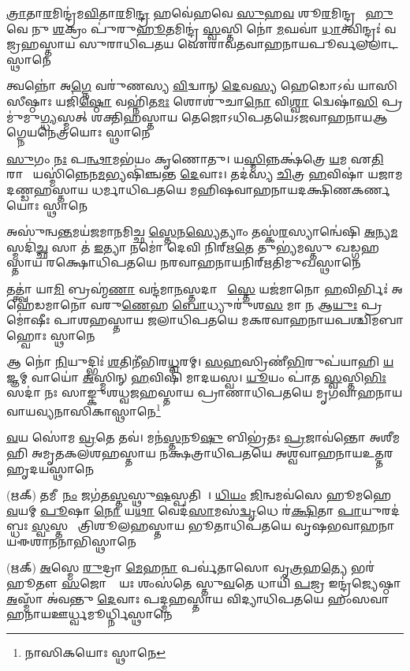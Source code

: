 %
{\ul{𑌤𑍍𑌰𑌾}𑌤𑌾\ul{𑌰}𑌮𑌿𑌨𑍍𑌦𑍍𑌰॑𑌮\ul{𑌵𑌿}𑌤𑌾\ul{𑌰}𑌮𑌿\ul{𑌨𑍍𑌦𑍍𑌰}\ul{} 𑌹𑌵𑍇॑𑌹𑌵𑍇 \ul{𑌸𑍁}𑌹\ul{𑌵}\ul{} 𑌶𑍂\ul{𑌰}𑌮𑌿𑌨𑍍𑌦𑍍𑌰𑌮𑍍᳚}%
{\ul{𑌹𑍁}𑌵𑍇 𑌨𑍁 \ul{𑌶}𑌕𑍍𑌰𑌂 𑌪𑍁॑𑌰𑍁\ul{𑌹𑍂}𑌤𑌮𑌿𑌨𑍍𑌦𑍍𑌰॑ \ul{𑌸𑍍𑌵}𑌸𑍍𑌤𑌿 𑌨𑍋॑ \ul{𑌮}𑌘𑌵𑌾॑ \ul{𑌧𑌾}𑌤𑍍𑌵𑌿𑌨𑍍𑌦𑍍𑌰𑌃॑}%
{𑌵𑌜𑍍𑌰𑌹𑌸𑍍𑌤𑌾𑌯 𑌸𑍁𑌰𑌾𑌧𑌿𑌪𑌤𑌯 𑌐𑌰𑌾𑌵𑌤𑌵𑌾𑌹𑌨𑌾𑌯}{𑌪𑍂𑌰𑍍𑌵}{𑌲𑌲𑌾𑌟𑌸𑍍𑌥𑌾𑌨𑍇}

%
{𑌤𑍍𑌵𑌨𑍍𑌨𑍋॑ 𑌅\ul{𑌗𑍍𑌨𑍇} 𑌵𑌰𑍁॑𑌣𑌸𑍍𑌯 \ul{𑌵𑌿}𑌦𑍍𑌵𑌾𑌨𑍍 \ul{𑌦𑍇}𑌵\ul{𑌸𑍍𑌯} 𑌹𑍇𑌡𑍋𑌽𑌵॑ 𑌯𑌾𑌸𑌿𑌸𑍀𑌷𑍍𑌠𑌾𑌃}%
{𑌯𑌜𑌿॑\ul{𑌷𑍍𑌠𑍋} 𑌵𑌹𑍍𑌨𑌿॑𑌤\ul{𑌮𑌃} 𑌶𑍋𑌶𑍁॑𑌚𑌾\ul{𑌨𑍋} 𑌵𑌿\ul{𑌶𑍍𑌵𑌾} 𑌦𑍍𑌵𑍇𑌷𑌾॑\ul{𑌸𑌿} 𑌪𑍍𑌰𑌮𑍁॑𑌮𑍁\ul{𑌗𑍍𑌧𑍍𑌯}𑌸𑍍𑌮𑌤𑍍}%
{𑌶𑌕𑍍𑌤𑌿𑌹𑌸𑍍𑌤𑌾𑌯 𑌤𑍇𑌜𑍋𑌽𑌧𑌿𑌪𑌤𑌯𑍇\-𑌽𑌜𑌵𑌾𑌹𑌨𑌾𑌯}{𑌆𑌗𑍍𑌨𑍇𑌯}{𑌨𑍇𑌤𑍍𑌰𑌯𑍋𑌃 𑌸𑍍𑌥𑌾𑌨𑍇}

%
{\ul{𑌸𑍁}𑌗𑌂 \ul{𑌨𑌃} 𑌪\ul{𑌨𑍍𑌥𑌾}𑌮𑌭॑𑌯𑌂 𑌕𑍃𑌣𑍋𑌤𑍁। 𑌯\ul{𑌸𑍍𑌮𑌿}𑌨𑍍𑌨𑌕𑍍𑌷॑𑌤𑍍𑌰𑍇 \ul{𑌯}𑌮 𑌏\ul{𑌤𑌿} 𑌰𑌾𑌜𑌾᳚}%
{𑌯𑌸𑍍𑌮𑌿॑𑌨𑍍𑌨𑍇𑌨\ul{𑌮}𑌭𑍍𑌯𑌷𑌿॑𑌞𑍍𑌚𑌨𑍍𑌤 \ul{𑌦𑍇}𑌵𑌾𑌃। 𑌤𑌦॑𑌸𑍍𑌯 \ul{𑌚𑌿}𑌤𑍍𑌰 \ul{𑌹}𑌵𑌿𑌷𑌾॑ 𑌯𑌜𑌾𑌮}%
{𑌦𑌣𑍍𑌡𑌹𑌸𑍍𑌤𑌾𑌯 𑌧𑌰𑍍𑌮𑌾𑌧𑌿𑌪𑌤𑌯𑍇 𑌮𑌹𑌿𑌷𑌵𑌾𑌹𑌨𑌾𑌯}{𑌦𑌕𑍍𑌷𑌿𑌣}{𑌕𑌰𑍍𑌣𑌯𑍋𑌃 𑌸𑍍𑌥𑌾𑌨𑍇}

%
{𑌅𑌸𑍁॑𑌨𑍍𑌵\ul{𑌨𑍍𑌤}𑌮𑌯॑𑌜𑌮𑌾𑌨𑌮𑌿𑌚𑍍𑌛 \ul{𑌸𑍍𑌤𑍇}𑌨\ul{𑌸𑍍𑌯𑍇}𑌤𑍍𑌯𑌾𑌂 𑌤𑌸𑍍𑌕॑\ul{𑌰}𑌸𑍍𑌯𑌾𑌨𑍍𑌵𑍇॑𑌷𑌿}%
{\ul{𑌅}𑌨𑍍𑌯\ul{𑌮}𑌸𑍍𑌮𑌦𑌿॑\ul{𑌚𑍍𑌛} 𑌸𑌾 𑌤॑ \ul{𑌇}𑌤𑍍𑌯𑌾 𑌨𑌮𑍋॑ 𑌦𑍇𑌵𑌿 𑌨𑌿𑌰𑍍‌𑌋\ul{𑌤𑍇} 𑌤𑍁𑌭𑍍𑌯॑𑌮𑌸𑍍𑌤𑍁}%
{𑌖𑌡𑍍𑌗𑌹𑌸𑍍𑌤𑌾𑌯 𑌰𑌕𑍍𑌷𑍋𑌧𑌿𑌪𑌤𑌯𑍇 𑌨𑌰𑌵𑌾𑌹𑌨𑌾𑌯}{𑌨𑌿𑌰𑍍‌𑌋𑌤𑌿}{𑌮𑍁𑌖𑌸𑍍𑌥𑌾𑌨𑍇}

%
{𑌤𑌤𑍍𑌤𑍍𑌵𑌾॑ 𑌯𑌾\ul{𑌮𑌿} 𑌬𑍍𑌰𑌹𑍍𑌮॑\ul{𑌣𑌾} 𑌵𑌨𑍍𑌦॑𑌮𑌾\ul{𑌨}𑌸𑍍𑌤𑌦𑌾 𑌶𑌾᳚\ul{𑌸𑍍𑌤𑍇} 𑌯𑌜॑𑌮𑌾𑌨𑍋 \ul{𑌹}𑌵𑌿𑌰𑍍𑌭𑌿𑌃॑}%
{𑌅𑌹𑍇॑𑌡𑌮𑌾𑌨𑍋 𑌵𑌰𑍁\ul{𑌣𑍇}𑌹 \ul{𑌬𑍋}𑌧𑍍𑌯𑍁𑌰𑍁॑𑌶\ul{𑌸} 𑌮𑌾 \ul{𑌨} 𑌆\ul{𑌯𑍁𑌃} 𑌪𑍍𑌰𑌮𑍋॑𑌷𑍀𑌃}%
{𑌪𑌾𑌶𑌹𑌸𑍍𑌤𑌾𑌯 𑌜𑌲𑌾𑌧𑌿𑌪𑌤𑌯𑍇 𑌮𑌕𑌰𑌵𑌾𑌹𑌨𑌾𑌯}{𑌪𑌶𑍍𑌚𑌿𑌮}{𑌬𑌾𑌹𑍍𑌵𑍋𑌃 𑌸𑍍𑌥𑌾𑌨𑍇}

%
{𑌆 𑌨𑍋॑ \ul{𑌨𑌿}𑌯𑍁𑌦𑍍𑌭𑌿𑌃॑ \ul{𑌶}𑌤𑌿𑌨𑍀॑𑌭𑌿𑌰\ul{𑌧𑍍𑌵}𑌰𑌮𑍍। \ul{𑌸}\ul{𑌹}𑌸𑍍𑌰𑌿𑌣𑍀॑\ul{𑌭𑌿}𑌰𑍁𑌪॑\-𑌯𑌾𑌹𑌿 \ul{𑌯}𑌜𑍍𑌞𑌮𑍍}%
{𑌵𑌾𑌯𑍋॑ \ul{𑌅}𑌸𑍍𑌮𑌿𑌨𑍍 \ul{𑌹}𑌵𑌿𑌷𑌿॑ 𑌮𑌾𑌦𑌯𑌸𑍍𑌵। \ul{𑌯𑍂}𑌯𑌂 𑌪𑌾॑𑌤 \ul{𑌸𑍍𑌵}𑌸𑍍𑌤𑌿\ul{𑌭𑌿𑌃} 𑌸𑌦𑌾॑ 𑌨𑌃}%
{𑌸𑌾𑌙𑍍𑌕𑍁𑌶𑌧𑍍𑌵𑌜𑌹𑌸𑍍𑌤𑌾𑌯 𑌪𑍍𑌰𑌾𑌣𑌾𑌧𑌿𑌪𑌤𑌯𑍇 𑌮𑍃𑌗𑌵𑌾𑌹𑌨𑌾𑌯}{𑌵𑌾𑌯𑌵𑍍𑌯}{𑌨𑌾𑌸𑌿𑌕𑌾𑌸𑍍𑌥𑌾𑌨𑍇\footnote{𑌨𑌾𑌸𑌿𑌕𑌯𑍋𑌃 𑌸𑍍𑌥𑌾𑌨𑍇}}

%
{\ul{𑌵}𑌯 𑌸𑍋॑𑌮 \ul{𑌵𑍍𑌰}𑌤𑍇 𑌤𑌵॑। 𑌮𑌨॑\ul{𑌸𑍍𑌤}𑌨𑍂\ul{𑌷𑍁} 𑌬𑌿𑌭𑍍𑌰॑𑌤𑌃}%
{\ul{𑌪𑍍𑌰}𑌜𑌾𑌵॑𑌨𑍍𑌤𑍋 𑌅𑌶𑍀𑌮𑌹𑌿}%
{𑌅𑌮𑍃𑌤𑌕𑌲𑌶𑌹𑌸𑍍𑌤𑌾𑌯 𑌨𑌕𑍍𑌷𑌤𑍍𑌰𑌾𑌧𑌿𑌪𑌤𑌯𑍇 𑌅𑌶𑍍𑌵𑌵𑌾𑌹𑌨𑌾𑌯}{𑌉𑌤𑍍𑌤𑌰}{𑌹𑍃𑌦𑌯𑌸𑍍𑌥𑌾𑌨𑍇}

%
{(𑌋𑌕𑍍) 𑌤𑌮𑍀𑌶𑌾᳚\ul{𑌨𑌂} 𑌜𑌗॑𑌤\ul{𑌸𑍍𑌤}𑌸𑍍𑌥𑍁\ul{𑌷}𑌸𑍍𑌪𑌤𑌿𑌮𑍍᳚। \ul{𑌧𑌿}\ul{𑌯𑌂} \ul{𑌜𑌿}𑌨𑍍𑌵𑌮𑌵॑𑌸𑍇 𑌹𑍂𑌮𑌹𑍇 \ul{𑌵}𑌯𑌮𑍍}%
{\ul{𑌪𑍂}𑌷𑌾 \ul{𑌨𑍋} 𑌯\ul{𑌥𑌾} 𑌵𑍇𑌦॑\ul{𑌸𑌾}𑌮𑌸॑\ul{𑌦𑍍𑌵𑍃}𑌧𑍇 𑌰॑\ul{𑌕𑍍𑌷𑌿}𑌤𑌾 \ul{𑌪𑌾}𑌯𑍁𑌰𑌦॑𑌬𑍍𑌧𑌃 \ul{𑌸𑍍𑌵}𑌸𑍍𑌤𑌯𑍇᳚}
{𑌤𑍍𑌰𑌿𑌶𑍂𑌲𑌹𑌸𑍍𑌤𑌾𑌯 𑌭𑍂𑌤𑌾𑌧𑌿𑌪𑌤𑌯𑍇 𑌵𑍃𑌷𑌭𑌵𑌾𑌹𑌨𑌾𑌯}{𑌈𑌶𑌾𑌨}{𑌨𑌾𑌭𑌿𑌸𑍍𑌥𑌾𑌨𑍇}

%
{(𑌋𑌕𑍍) \ul{𑌅}𑌸𑍍𑌮𑍇 \ul{𑌰𑍁}𑌦𑍍𑌰𑌾 \ul{𑌮𑍇}𑌹\ul{𑌨𑌾} 𑌪𑌰𑍍𑌵॑𑌤𑌾𑌸𑍋 𑌵𑍃\ul{𑌤𑍍𑌰}𑌹\ul{𑌤𑍍𑌯𑍇} 𑌭𑌰॑𑌹𑍂𑌤𑍗 \ul{𑌸}𑌜𑍋𑌷𑌾𑌃᳚ }%
{𑌯𑌃 𑌶𑌂𑌸॑𑌤𑍇 𑌸𑍍𑌤𑍁\ul{𑌵}𑌤𑍇 𑌧𑌾𑌯𑌿॑ \ul{𑌪}𑌜𑍍𑌰 𑌇𑌨𑍍𑌦𑍍𑌰॑𑌜𑍍𑌯𑍇𑌷𑍍𑌠𑌾 \ul{𑌅}𑌸𑍍𑌮𑌾𑌁 𑌅॑𑌵𑌨𑍍𑌤𑍁 \ul{𑌦𑍇}𑌵𑌾𑌃}%
{𑌪𑌦𑍍𑌮𑌹𑌸𑍍𑌤𑌾𑌯 𑌵𑌿𑌦𑍍𑌯𑌾𑌧𑌿𑌪𑌤𑌯𑍇 𑌹𑌂𑌸𑌵𑌾𑌹𑌨𑌾𑌯}{𑌊𑌰𑍍𑌧𑍍𑌵}{𑌮𑍂𑌰𑍍𑌧𑍍𑌨𑌿𑌸𑍍𑌥𑌾𑌨𑍇}


